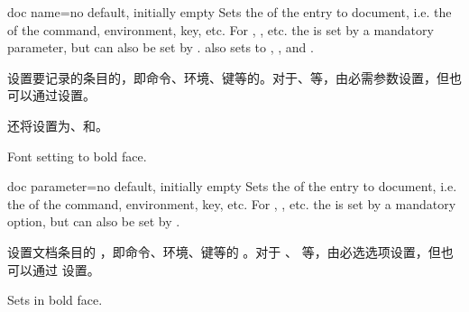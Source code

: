 \begin{docTcbKey}[][doc new={2020-04-22}]{doc name}{=}{no default, initially empty}
Sets the  of the entry to document, i.e. the  of the
command, environment, key, etc. For , , etc.
the  is set by a mandatory parameter, but can also be set
by .
 also sets  to
, ,
and .

设置要记录的条目的，即命令、环境、键等的。对于、等，由必需参数设置，但也可以通过设置。

还将设置为、和。
\begin{dispExample}
\begin{docCommands}[
doc no index,  %
doc name      = bfseries,
] {}
Font setting to bold face.
\end{docCommands}
\end{dispExample}
\end{docTcbKey}


\begin{docTcbKey}[][doc new={2020-04-22}]{doc parameter}{=}{no default, initially empty}
Sets the  of the entry to document, i.e. the  of the
command, environment, key, etc. For , , etc.
the  is set by a mandatory option, but can also be set
by .

设置文档条目的 ，即命令、环境、键等的 。对于 、 等，由必选选项设置，但也可以通过  设置。
\begin{dispExample}
\begin{docCommands}[
doc no index,  %
doc name      = textbf,
doc parameter = \marg{text},
] {}
Sets  in bold face.
\end{docCommands}
\end{dispExample}
\end{docTcbKey}



